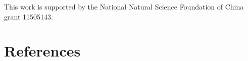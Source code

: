 \documentclass[a4paper]{jpconf}
\begin{document}
\ack
This work is supported by the National Natural Science Foundation of China grant 11505143. 



\section*{References}
  
\end{document}
